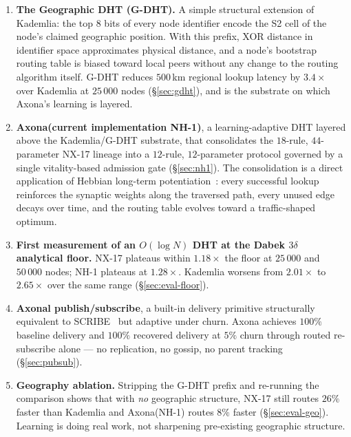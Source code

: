 \documentclass[conference]{IEEEtran}
\newcommand{\axona}{Axona\xspace}
\newcommand{\nhone}{NH-1\xspace}
\newcommand{\GDHT}{G-DHT\xspace}
\newcommand{\NXseventeen}{NX-17\xspace}
\begin{document}
\begin{enumerate}
\item \textbf{The Geographic DHT (\GDHT).} A simple structural extension
of Kademlia: the top $8$ bits of every node identifier encode the S2
cell of the node's claimed geographic position. With this prefix, XOR
distance in identifier space approximates physical distance, and a
node's bootstrap routing table is biased toward local peers without
any change to the routing algorithm itself. \GDHT reduces $500$\,km
regional lookup latency by $3.4\times$ over Kademlia at $25\,000$
nodes (\S\ref{sec:gdht}), and is the substrate on which \axona's
learning is layered.

\item \textbf{\axona (current implementation \nhone)}, a learning-adaptive
DHT layered above the Kademlia/\GDHT substrate, that consolidates the
$18$-rule, $44$-parameter \NXseventeen lineage into a $12$-rule,
$12$-parameter protocol governed by a single vitality-based admission gate
(\S\ref{sec:nh1}).
The consolidation is a direct application of Hebbian long-term
potentiation~\cite{hebb1949organization,bliss1973long}: every
successful lookup reinforces the synaptic weights along the traversed
path, every unused edge decays over time, and the routing table
evolves toward a traffic-shaped optimum.

\item \textbf{First measurement of an $O(\log N)$ DHT at the Dabek
$3\delta$ analytical floor.} \NXseventeen plateaus within $1.18\times$
the floor at $25\,000$ and $50\,000$ nodes; \nhone plateaus at
$1.28\times$. Kademlia worsens from $2.01\times$ to $2.65\times$ over
the same range (\S\ref{sec:eval-floor}).

\item \textbf{Axonal publish/subscribe}, a built-in delivery primitive
structurally equivalent to SCRIBE~\cite{castro2002scribe} but adaptive
under churn. \axona achieves $100\%$ baseline delivery and $100\%$
recovered delivery at $5\%$ churn through routed re-subscribe alone ---
no replication, no gossip, no parent tracking (\S\ref{sec:pubsub}).

\item \textbf{Geography ablation.} Stripping the \GDHT prefix and
re-running the comparison shows that with \emph{no} geographic
structure, \NXseventeen still routes $26\%$ faster than Kademlia and
\axona (\nhone) routes $8\%$ faster (\S\ref{sec:eval-geo}). Learning is
doing real work, not sharpening pre-existing geographic structure.
\end{enumerate}
\end{document}
